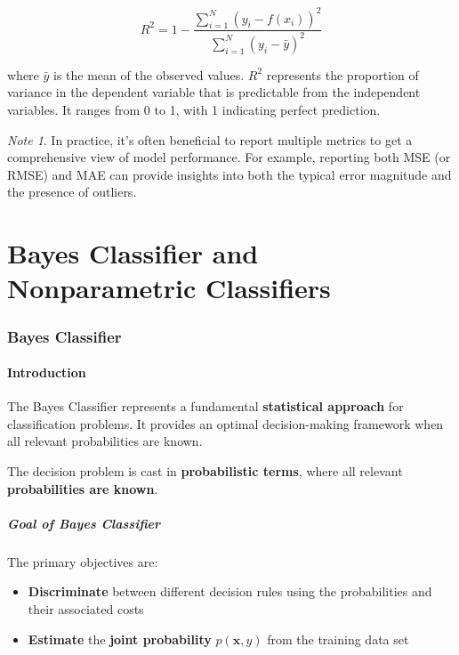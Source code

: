 \documentclass[11pt,a4paper]{article}
\theoremstyle{definition}
\theoremstyle{plain}
\theoremstyle{remark}
\newtheorem*{remark}{Note}
\begin{document}
\begin{equation}
R^2 = 1 - \frac{\sum_{i=1}^{N} (y_i - f(x_i))^2}{\sum_{i=1}^{N} (y_i - \bar{y})^2}
\end{equation}

where $\bar{y}$ is the mean of the observed values. $R^2$ represents the proportion of variance in the dependent variable that is predictable from the independent variables. It ranges from 0 to 1, with 1 indicating perfect prediction.

\begin{remark}
In practice, it's often beneficial to report multiple metrics to get a comprehensive view of model performance. For example, reporting both MSE (or RMSE) and MAE can provide insights into both the typical error magnitude and the presence of outliers.
\end{remark}


\newpage

\part{Bayes Classifier and Nonparametric Classifiers}

\section{Bayes Classifier}

\subsection{Introduction}

The Bayes Classifier represents a fundamental \textbf{statistical approach} for classification problems. It provides an optimal decision-making framework when all relevant probabilities are known.

\begin{tcolorbox}[colback=blue!5!white,colframe=blue!75!black,title=\textbf{Core Hypothesis}]
The decision problem is cast in \textbf{probabilistic terms}, where all relevant \textbf{probabilities are known}.
\end{tcolorbox}

\subsubsection{Goal of Bayes Classifier}

The primary objectives are:

\begin{itemize}
    \item \textbf{Discriminate} between different decision rules using the probabilities and their associated costs
    \item \textbf{Estimate} the \textbf{joint probability} $p(\mathbf{x}, y)$ from the training data set
\end{itemize}
\end{document}
